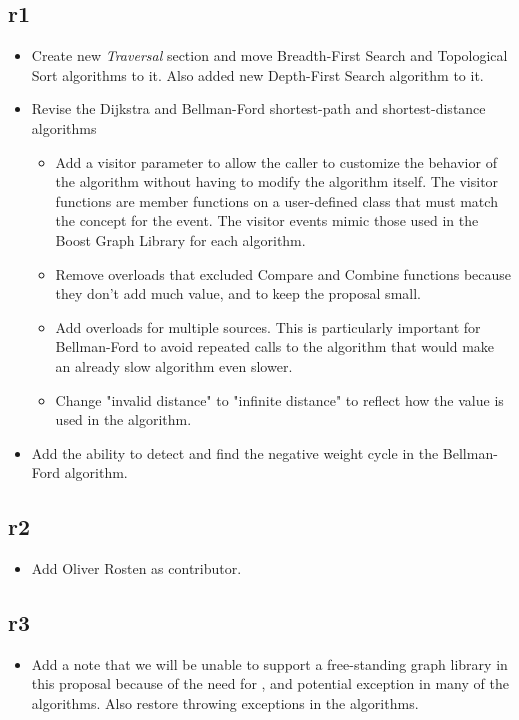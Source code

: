 \subsection*{\paperno r1}
\begin{itemize}
      \item Create new \textit{Traversal} section and move Breadth-First Search and Topological Sort algorithms to it.
            Also added new Depth-First Search algorithm to it.
      \item Revise the Dijkstra and Bellman-Ford shortest-path and shortest-distance algorithms
            \begin{itemize}
                  \item Add a visitor parameter to allow the caller to
                        customize the behavior of the algorithm without having to modify the algorithm itself.
                        The visitor functions are member functions on a user-defined class that must match the concept for the event.
                        The visitor events mimic those used in the Boost Graph Library for each algorithm.
                  \item Remove overloads that excluded Compare and Combine functions because they don't add much value,
                        and to keep the proposal small.
                  \item Add overloads for multiple sources. This is particularly important for Bellman-Ford to avoid
                        repeated calls to the algorithm that would make an already slow algorithm even slower.
                  \item Change "invalid distance" to "infinite distance" to reflect how the value is used 
                        in the algorithm.
            \end{itemize}
      \item Add the ability to detect and find the negative weight cycle in the Bellman-Ford algorithm.
\end{itemize}

\subsection*{\paperno r2}
\begin{itemize}
      \item Add Oliver Rosten as contributor.
\end{itemize}

\subsection*{\paperno r3}
\begin{itemize}
      \item Add a note that we will be unable to support a free-standing graph library in this proposal because
            of the need for ,  and potential  exception in many of 
            the algorithms. Also restore throwing exceptions in the algorithms.
\end{itemize}
